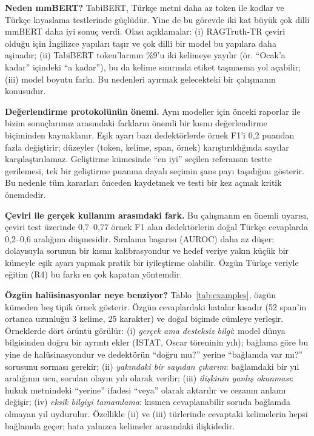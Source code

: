 \documentclass[conference,a4paper]{IEEEtran}
\begin{document}
\textbf{Neden mmBERT?} TabiBERT, Türkçe metni daha az token ile kodlar ve Türkçe kıyaslama testlerinde güçlüdür. Yine de bu görevde iki kat büyük çok dilli mmBERT daha iyi sonuç verdi. Olası açıklamalar: (i) RAGTruth-TR çeviri olduğu için İngilizce yapıları taşır ve çok dilli bir model bu yapılara daha aşinadır; (ii) TabiBERT token'larının \%9'u iki kelimeye yayılır (ör. ``Ocak'a kadar'' içindeki ``a kadar''), bu da kelime sınırında etiket taşmasına yol açabilir; (iii) model boyutu farkı. Bu nedenleri ayırmak gelecekteki bir çalışmanın konusudur.

\textbf{Değerlendirme protokolünün önemi.} Aynı modeller için önceki raporlar ile bizim sonuçlarımız arasındaki farkların önemli bir kısmı değerlendirme biçiminden kaynaklanır. Eşik ayarı bazı dedektörlerde örnek F1'i 0{,}2 puandan fazla değiştirir; düzeyler (token, kelime, span, örnek) karıştırıldığında sayılar karşılaştırılamaz. Geliştirme kümesinde ``en iyi'' seçilen referansın testte gerilemesi, tek bir geliştirme puanına dayalı seçimin şans payı taşıdığını gösterir. Bu nedenle tüm kararları önceden kaydetmek ve testi bir kez açmak kritik önemdedir.

\textbf{Çeviri ile gerçek kullanım arasındaki fark.} Bu çalışmanın en önemli uyarısı, çeviri test üzerinde 0{,}7--0{,}77 örnek F1 alan dedektörlerin doğal Türkçe cevaplarda 0{,}2--0{,}6 aralığına düşmesidir. Sıralama başarısı (AUROC) daha az düşer; dolayısıyla sorunun bir kısmı kalibrasyondur ve hedef veriye yakın küçük bir kümeyle eşik ayarı yapmak pratik bir iyileştirme olabilir. Özgün Türkçe veriyle eğitim (R4) bu farkı en çok kapatan yöntemdir.

\textbf{Özgün halüsinasyonlar neye benziyor?} Tablo~\ref{tab:examples}, özgün kümeden beş tipik örnek gösterir. Özgün cevaplardaki hatalar kısadır (52 span'in ortanca uzunluğu 3 kelime, 25 karakter) ve doğal biçimde cümleye yerleşir. Örneklerde dört örüntü görülür: (i) \emph{gerçek ama desteksiz bilgi}: model dünya bilgisinden doğru bir ayrıntı ekler (ISTAT, Oscar töreninin yılı); bağlama göre bu yine de halüsinasyondur ve dedektörün ``doğru mu?'' yerine ``bağlamda var mı?'' sorusunu sorması gerekir; (ii) \emph{yakındaki bir sayıdan çıkarım}: bağlamdaki bir yıl aralığının ucu, sorulan olayın yılı olarak verilir; (iii) \emph{ilişkinin yanlış okunması}: hukuk metnindeki ``yerine'' ifadesi ``veya'' olarak aktarılır ve cezanın anlamı değişir; (iv) \emph{eksik bilgiyi tamamlama}: kısmen cevaplanabilir soruda bağlamda olmayan yıl uydurulur. Özellikle (ii) ve (iii) türlerinde cevaptaki kelimelerin hepsi bağlamda geçer; hata yalnızca kelimeler arasındaki ilişkidedir.
\end{document}
